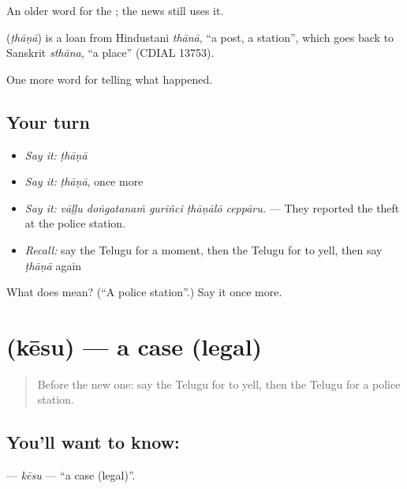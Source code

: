 An older word for the  ; the news still uses it.

\begin{cousinweb}
\textbf{} (\emph{ṭhāṇā}) is a loan from Hindustani \emph{thānā}, \textquotedblleft{}a post, a station\textquotedblright{}, which goes back to Sanskrit \emph{sthāna}, \textquotedblleft{}a place\textquotedblright{} (CDIAL 13753).
\end{cousinweb}

\begin{grammarlens}[title={What you've built}]
One more word for telling what happened.
\end{grammarlens}

\subsection*{Your turn}
\begin{itemize}
\raggedright
  \item \emph{Say it:} \emph{ṭhāṇā}
  \item \emph{Say it:} \emph{ṭhāṇā}, once more
  \item \emph{Say it:} \emph{vāḷḷu doṅgatanaṁ guriñci ṭhāṇālō ceppāru.} — They reported the theft at the police station.
  \item \emph{Recall:} say the Telugu for a moment, then the Telugu for to yell, then say \emph{ṭhāṇā} again
\end{itemize}

\begin{tcolorbox}[breakable,colback=teal!4,colframe=teal!35!black,title={Before you move on}]
What does  mean? (\textquotedblleft{}A police station\textquotedblright{}.) Say it once more.
\end{tcolorbox}
\section[\texorpdfstring{\te{కేసు} (kēsu)}{కేసు (kēsu)}]{ (kēsu) — a case (legal)}

\label{lesson:TE-C333-kesu}



\begin{quote}
Before the new one: say the Telugu for to yell, then the Telugu for a police station.
\end{quote}

\subsection*{You'll want to know: }
\textbf{} — \emph{kēsu} — \textquotedblleft{}a case (legal)\textquotedblright{}.

